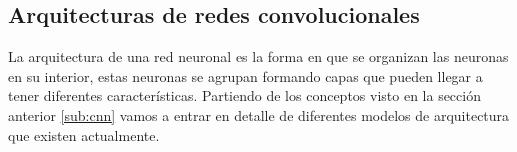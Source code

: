 

\subsection{Arquitecturas de redes convolucionales}\label{sub:arquitecturacnn}
La arquitectura de una red neuronal es la forma en que se organizan  las neuronas en su interior, estas neuronas se agrupan formando capas que pueden llegar a tener diferentes características. Partiendo de los conceptos visto en la sección anterior \ref{sub:cnn} vamos a entrar en detalle de diferentes modelos de arquitectura que existen actualmente.

